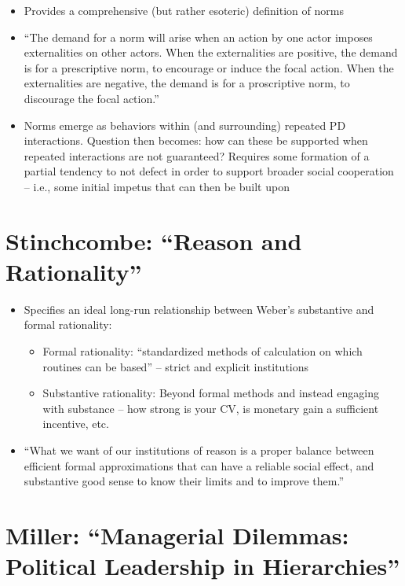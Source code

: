 \documentclass[12pt]{article}
\begin{document}
\begin{itemize}
    \item Provides a comprehensive (but rather esoteric) definition of norms
    \item ``The demand for a norm will arise when an action by one actor imposes externalities on other actors. When the externalities are positive, the demand is for a prescriptive norm, to encourage or induce the focal action. When the externalities are negative, the demand is for a proscriptive norm, to discourage the focal action.''
    \item Norms emerge as behaviors within (and surrounding) repeated PD interactions. Question then becomes: how can these be supported when repeated interactions are not guaranteed? Requires some formation of a partial tendency to not defect in order to support broader social cooperation -- i.e., some initial impetus that can then be built upon
\end{itemize}


\section{Stinchcombe: ``Reason and Rationality''}

\begin{itemize}
    \item Specifies an ideal long-run relationship between Weber's substantive and formal rationality:
    \begin{itemize}
        \item Formal rationality: ``standardized methods of calculation on which routines can be based'' -- strict and explicit institutions
        \item Substantive rationality: Beyond formal methods and instead engaging with substance -- how strong is your CV, is monetary gain a sufficient incentive, etc.
    \end{itemize}
    \item ``What we want of our institutions of reason is a proper balance between efficient formal approximations that can have a reliable social effect, and substantive good sense to know their limits and to improve them.''
\end{itemize}


\section{Miller: ``Managerial Dilemmas: Political Leadership in Hierarchies''}
\end{document}
